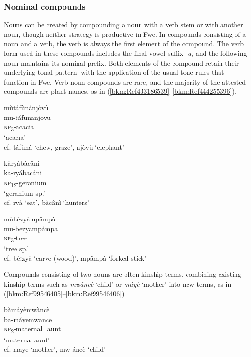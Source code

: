\subsubsection{Nominal compounds}

Nouns can be created by compounding a noun with a verb stem or with another noun, though neither strategy is productive in Fwe. In compounds consisting of a noun and a verb, the verb is always the first element of the compound. The verb form used in these compounds includes the final vowel suffix \textit{-a}, and the following noun maintains its nominal prefix. Both elements of the compound retain their underlying tonal pattern, with the application of the usual tone rules that function in Fwe. Verb-noun compounds are rare, and the majority of the attested compounds are plant names, as in (\ref{bkm:Ref433186539}--\ref{bkm:Ref444255396}).

\ea
\label{bkm:Ref433186539}
\glll mùtáfùnànjòvù\\
mu-táfunanjovu\\
\textsc{np}\textsubscript{3}-acacia\\
\glt ‘acacia’\\
 cf. táfùnà ‘chew, graze’, njòvù ‘elephant’
\z

\ea
\glll kàryábàcânì\\
ka-ryábacáni\\
\textsc{np}\textsubscript{12}-geranium\\
\glt ‘geranium sp.’ \\
 cf. ryà ‘eat’, bàcânì ‘hunters’
\z

\ea
\label{bkm:Ref444255396}
\glll mùbèzyàmpâmpà\\
mu-bezyampámpa\\
\textsc{np}\textsubscript{3}-tree\\
\glt ‘tree sp.’\\
 cf. bèːzyà ‘carve (wood)’, mpâmpà ‘forked stick’
\z

Compounds consisting of two nouns are often kinship terms, combining existing kinship terms such as \textit{mwâncè} ‘child’ or \textit{máyè} ‘mother’ into new terms, as in (\ref{bkm:Ref99546405}--\ref{bkm:Ref99546406}).

\ea
\label{bkm:Ref99546405}
\glll bàmáyèmwàncè\\
ba-máyemwance\\
\textsc{np}\textsubscript{2}-maternal\_aunt\\
\glt ‘maternal aunt’\\
 cf. maye ‘mother’, mw-áncè ‘child’
\z

